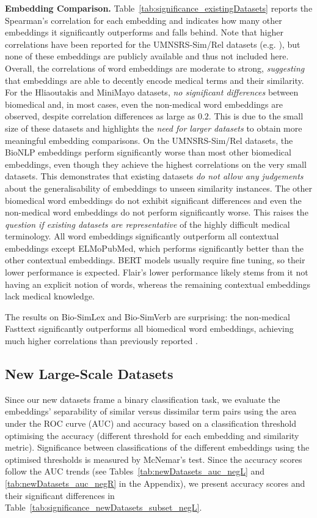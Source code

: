 \documentclass[letterpaper]{article} %
\begin{document}
\noindent\textbf{Embedding Comparison.}
Table~\ref{tab:significance_existingDatasets} reports the Spearman's correlation for each embedding
 and indicates how many other embeddings it significantly outperforms and falls behind.
Note that higher correlations have been reported for the UMNSRS-Sim/Rel datasets (e.g. \cite{LingEtAl2017,AbdeddaimVS2018}), but none of these embeddings are publicly available and thus not included here.
Overall, the correlations of word embeddings are moderate to strong, \emph{suggesting} that embeddings are able to decently encode medical terms and their similarity.
For the Hliaoutakis and MiniMayo datasets,
\emph{no significant differences} between
biomedical and, in most cases, even the non-medical word embeddings are observed, despite correlation differences as large as $0.2$.
This is due to the small size of these datasets and highlights the \emph{need for larger datasets} to obtain more meaningful embedding comparisons.
On the UMNSRS-Sim/Rel datasets, the BioNLP embeddings perform significantly worse than most other biomedical embeddings, even though they achieve the highest correlations on the very small datasets.
This demonstrates that existing datasets \emph{do not allow any judgements} about the generalisability of embeddings to unseen similarity instances.
The other biomedical word embeddings do not exhibit significant differences and even the non-medical word embeddings do not perform significantly worse.
This raises the \emph{question if existing datasets are representative} of the highly difficult medical terminology.
All word embeddings significantly outperform
all contextual embeddings except ELMoPubMed, which performs significantly better than the other contextual embeddings. BERT models usually require fine tuning, so their lower performance is expected. Flair's lower performance likely stems from it not having an explicit notion of words, whereas the remaining contextual embeddings lack medical knowledge.

The results on Bio-SimLex and Bio-SimVerb are surprising: the non-medical Fasttext significantly outperforms all biomedical word embeddings, achieving much higher correlations  than previously reported \cite{ChiuPVK2018}.


\subsection{New Large-Scale Datasets}
Since our new datasets frame a binary classification task, we evaluate the embeddings' separability of similar versus dissimilar term pairs using the area under the ROC curve (AUC) and accuracy based on a classification threshold optimising the accuracy (different threshold for each embedding and similarity metric).
Significance between classifications of the different embeddings using the optimised thresholds is measured by McNemar's test.
Since the accuracy scores follow the AUC trends (see Tables~\ref{tab:newDatasets_auc_negL} and \ref{tab:newDatasets_auc_negR} in the Appendix), we present accuracy scores and their significant differences in Table~\ref{tab:significance_newDatasets_subset_negL}.
\end{document}
